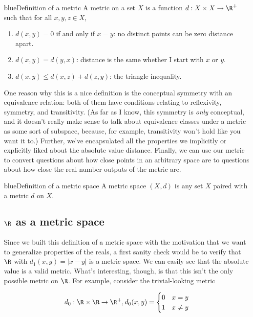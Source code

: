 \documentclass[../analysis.tex]{subfiles}
\begin{document}
    \begin{mycolorbox}{blue}{Definition of a metric}
        A metric on a set $X$ is a function $d: X \times X \to \R^+$ such that for all $x, y, z \in X$,

        \begin{enumerate}
            \item $d(x, y) = 0$ if and only if $x = y$: no distinct points can be zero distance apart.
            \item $d(x, y) = d(y, x)$: distance is the same whether I start with $x$ or $y$.
            \item $d(x, y) \leq d(x, z) + d(z, y)$: the triangle inequality.
        \end{enumerate}
    \end{mycolorbox}
    
    One reason why this is a nice definition is the conceptual symmetry with an equivalence relation: both of them have conditions relating to reflexivity, symmetry, and transitivity. (As far as I know, this symmetry is \emph{only} conceptual, and it doesn't really make sense to talk about equivalence classes under a metric as some sort of subspace, because, for example, transitivity won't hold like you want it to.) Further, we've encapsulated all the properties we implicitly or explicitly liked about the absolute value distance. Finally, we can use our metric to convert questions about how close points in an arbitrary space are to questions about how close the real-number outputs of the metric are.

    \begin{mycolorbox}{blue}{Definition of a metric space}
        A metric space $(X, d)$ is any set $X$ paired with a metric $d$ on $X$.
    \end{mycolorbox}
    
    \subsection{$\R$ as a metric space}

    Since we built this definition of a metric space with the motivation that we want to generalize properties of the reals, a first sanity check would be to verify that $\R$ with $d_1(x, y) = |x - y|$ is a metric space. We can easily see that the absolute value is a valid metric. What's interesting, though, is that this isn't the only possible metric on $\R$. For example, consider the trivial-looking metric

    \begin{align*}
        d_0: \R \times \R \to \R^+, d_0(x, y) = \begin{cases} 0 & x = y \\ 1 & x \neq y \end{cases}
    \end{align*}
\end{document}
